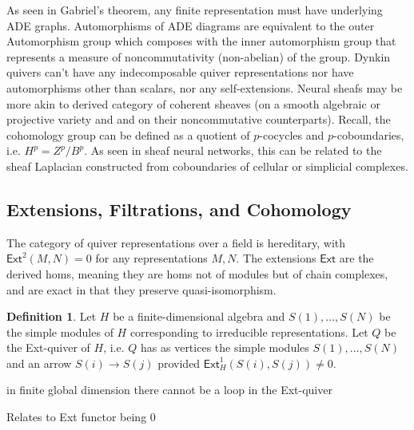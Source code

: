 \documentclass{article}
\theoremstyle{definition}
\newtheorem{definition}{Definition}[section]
\begin{document}
As seen in Gabriel's theorem, any finite representation must have underlying ADE graphs. Automorphisms of ADE diagrams are equivalent to the outer Automorphism group which composes with the inner automorphism group that represents a measure of noncommutativity (non-abelian) of the group.  Dynkin quivers can't have any indecomposable quiver representations nor have automorphisms other than scalars, nor any self-extensions. Neural sheafs may be more akin to derived category of coherent sheaves (on a smooth algebraic or projective variety and and on their noncommutative counterparts). 
Recall, the cohomology group can be defined as a quotient of $p$-cocycles and $p$-coboundaries, i.e. $H^p = Z^p / B^p$. 
As seen in sheaf neural networks, this can be related to the sheaf Laplacian constructed from coboundaries of cellular or simplicial complexes. 

\subsection{Extensions, Filtrations, and Cohomology}
\label{sec:extensions}

The category of quiver representations over a field is hereditary, with $\mathsf{Ext}^2(M, N)=0$ for any representations $M, N$. The extensions $\mathsf{Ext}$ are the derived homs, meaning they are homs not of modules but of chain complexes, and are exact in that they preserve quasi-isomorphism. 

\begin{definition}
    Let $H$ be a finite-dimensional algebra and $S(1),\dots,S(N)$ be the simple modules of $H$ corresponding to irreducible representations. Let $Q$ be the Ext-quiver of $H$, i.e. $Q$ has as vertices the simple modules $S(1),\dots, S(N)$ and an arrow $S(i) \to S(j)$ provided $\mathsf{Ext}^1_H(S(i),S(j)) \neq 0$.
\end{definition} 

in finite global dimension there cannot be a loop in the Ext-quiver


Relates to Ext functor being 0
\end{document}
